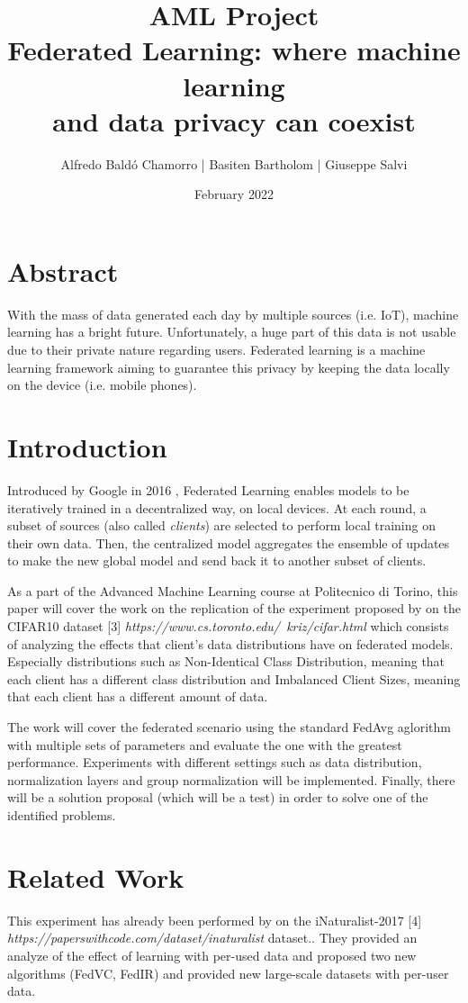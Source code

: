 \documentclass[twocolumn]{article}
\title{AML Project
\\Federated Learning: where machine learning \\and data privacy can coexist
}
\author{
Alfredo Baldó Chamorro | 
Basiten Bartholom |
Giuseppe Salvi
}
\date{February 2022}
\begin{document}
\maketitle

\section{Abstract}
With the mass of data generated each day by multiple sources (i.e. IoT), machine learning has a bright future. Unfortunately, a huge part of this data is not usable due to their private nature regarding users. Federated learning is a machine learning framework aiming to guarantee this privacy by keeping the data locally on the device (i.e. mobile phones).
\section{Introduction} %

Introduced by Google in 2016 \cite{DBLP:journals/corr/KonecnyMYRSB16}, Federated Learning enables models to be iteratively trained in a decentralized way, on local devices. At each round, a subset of sources (also called \emph{clients}) are selected to perform local training on their own data. Then, the centralized model aggregates the ensemble of updates to make the new global model and send back it to another subset of clients. 

As a part of the Advanced Machine Learning course at Politecnico di Torino, this paper will cover the work on the replication of the experiment proposed by \cite{DBLP:journals/corr/abs-2003-08082} on the CIFAR10 dataset [3] \emph{https://www.cs.toronto.edu/~kriz/cifar.html} which consists of analyzing the effects that client's data distributions have on federated models. Especially distributions such as Non-Identical Class Distribution, meaning that each client has a different class distribution and Imbalanced Client Sizes, meaning that each client has a different amount of data. 

The work will cover the federated scenario using the standard FedAvg aglorithm with multiple sets of parameters and evaluate the one with the greatest performance. Experiments with different settings such as data distribution, normalization layers and group normalization will be implemented. Finally, there will be a solution proposal (which will be a test) in order to solve one of the identified problems.

\section{Related Work} %
This experiment has already been performed by \cite{DBLP:journals/corr/abs-2003-08082}  on the iNaturalist-2017 [4] \emph{https://paperswithcode.com/dataset/inaturalist} dataset.. They provided an analyze of the effect of learning with per-used data and proposed two new algorithms (FedVC, FedIR) and provided new large-scale datasets with per-user data.
\end{document}
